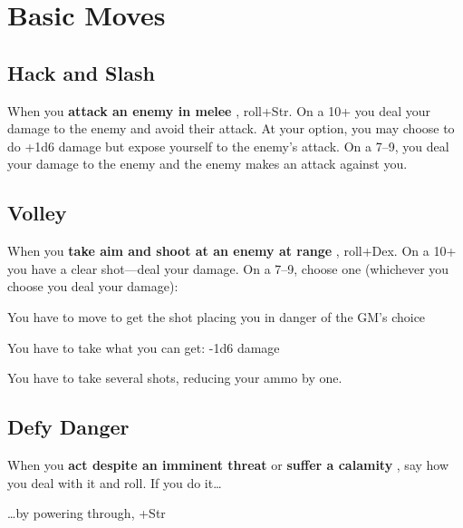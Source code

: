\chapter{Basic Moves}
   
            
\section{Hack and Slash}    
       

When you {\bf attack an enemy in melee} , roll+Str. On a 10+ you deal your damage to the enemy and avoid their attack. At your option, you may choose to do +1d6 damage but expose yourself to the enemy's attack. On a 7–9, you deal your damage to the enemy and the enemy makes an attack against you.

       
\section{Volley}   
       

When you {\bf take aim and shoot at an enemy at range} , roll+Dex. On a 10+ you have a clear shot—deal your damage. On a 7–9, choose one (whichever you choose you deal your damage):

       
\startitemize[1,packed]
         
\item You have to move to get the shot placing you in danger of the GM's choice

         
\item You have to take what you can get: -1d6 damage

         
\item You have to take several shots, reducing your ammo by one.

       
\stopitemize
       
\section{Defy Danger}    
       

When you {\bf act despite an imminent threat}  or {\bf suffer a calamity} , say how you deal with it and roll. If you do it…

       
\startitemize[1,packed]
         
\item …by powering through, +Str

